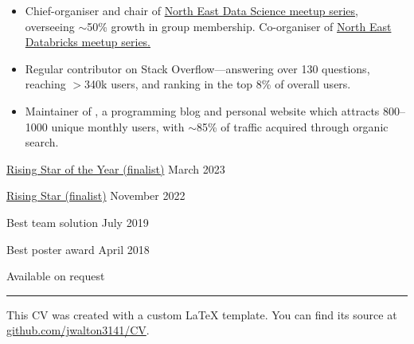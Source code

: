 \documentclass[12pt, a4paper]{article}
\begin{document}
\begin{itemize}[
    itemsep=.2em,
    labelwidth=2em,
    leftmargin=2em,
    topsep=0em]

\item[\faIcon{users}]%
     {Chief-organiser and chair of
      \href{https://www.meetup.com/newcastle-upon-tyne-data-science-meetup/}%
           {North East Data Science meetup series},
      overseeing $\sim$50\% growth in group membership. Co-organiser of
      \href{https://www.meetup.com/north-east-databricks-meetup/}%
           {North East Databricks meetup series.}}

\item[\faIcon{stack-overflow}]%
     {Regular contributor on Stack Overflow---answering over 130 questions,
      reaching $>$340k users, and ranking in the top 8\% of overall users.}%

\item[\faIcon{mouse-pointer}]%
     {Maintainer of \href{https://\website}{\website}, a programming blog and
      personal website which attracts 800--1000 unique monthly users, with
      $\sim$85\% of traffic acquired through organic search.}

\end{itemize}


%
          {\href{https://predatech.co.uk/british-data-awards-2023-finalists-announced/}%
                {Rising Star of the Year (finalist)}}%
          {March 2023}

%
          {\href{https://www.dynamonortheast.co.uk/dynamites22-shortlist-unveiled/}%
                {Rising Star (finalist)}}%
          {November 2022}

%
          {Best team solution}%
          {July 2019}

%
          {Best poster award}%
          {April 2018}


Available on request

\vfill
\hypersetup{urlcolor=light-grey}%
\color{light-grey}%
\rule{\textwidth}{1.25pt}

\footnotesize\raggedleft This CV was created with a custom \LaTeX{}
template. You can find its source at
\href{https://github.com/jwalton3141/CV}{github.com/jwalton3141/CV}.
\end{document}
